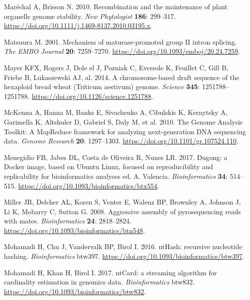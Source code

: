 \documentclass[
  12pt,
  oneside,
  openany]{book}
\begin{document}
\leavevmode\hypertarget{ref-Mar_chal_2010}{}%
Maréchal A, Brisson N. 2010. Recombination and the maintenance of plant organelle genome stability. \emph{New Phytologist} \textbf{186}: 299--317. \url{https://doi.org/10.1111/j.1469-8137.2010.03195.x}.

\leavevmode\hypertarget{ref-Matsuura_2001}{}%
Matsuura M. 2001. Mechanism of maturase-promoted group II intron splicing. \emph{The EMBO Journal} \textbf{20}: 7259--7270. \url{https://doi.org/10.1093/emboj/20.24.7259}.

\leavevmode\hypertarget{ref-IWGSC_2014}{}%
Mayer KFX, Rogers J, Dole el J, Pozniak C, Eversole K, Feuillet C, Gill B, Friebe B, Lukaszewski AJ, al. 2014. A chromosome-based draft sequence of the hexaploid bread wheat (Triticum aestivum) genome. \emph{Science} \textbf{345}: 1251788--1251788. \url{https://doi.org/10.1126/science.1251788}.

\leavevmode\hypertarget{ref-McKenna_2010}{}%
McKenna A, Hanna M, Banks E, Sivachenko A, Cibulskis K, Kernytsky A, Garimella K, Altshuler D, Gabriel S, Daly M, et al. 2010. The Genome Analysis Toolkit: A MapReduce framework for analyzing next-generation DNA sequencing data. \emph{Genome Research} \textbf{20}: 1297--1303. \url{https://doi.org/10.1101/gr.107524.110}.

\leavevmode\hypertarget{ref-Menegidio_2017}{}%
Menegidio FB, Jabes DL, Costa de Oliveira R, Nunes LR. 2017. Dugong: a Docker image, based on Ubuntu Linux, focused on reproducibility and replicability for bioinformatics analyses ed. A. Valencia. \emph{Bioinformatics} \textbf{34}: 514--515. \url{https://doi.org/10.1093/bioinformatics/btx554}.

\leavevmode\hypertarget{ref-Miller_2008}{}%
Miller JR, Delcher AL, Koren S, Venter E, Walenz BP, Brownley A, Johnson J, Li K, Mobarry C, Sutton G. 2008. Aggressive assembly of pyrosequencing reads with mates. \emph{Bioinformatics} \textbf{24}: 2818--2824. \url{https://doi.org/10.1093/bioinformatics/btn548}.

\leavevmode\hypertarget{ref-Mohamadi_2016}{}%
Mohamadi H, Chu J, Vandervalk BP, Birol I. 2016. ntHash: recursive nucleotide hashing. \emph{Bioinformatics} btw397. \url{https://doi.org/10.1093/bioinformatics/btw397}.

\leavevmode\hypertarget{ref-Mohamadi_2017}{}%
Mohamadi H, Khan H, Birol I. 2017. ntCard: a streaming algorithm for cardinality estimation in genomics data. \emph{Bioinformatics} btw832. \url{https://doi.org/10.1093/bioinformatics/btw832}.
\end{document}
